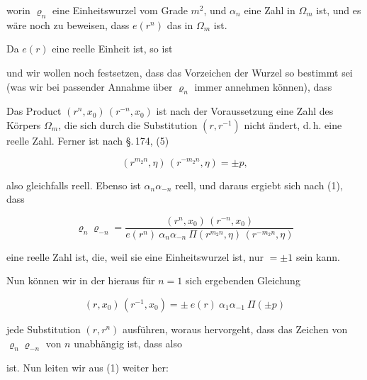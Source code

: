 worin $\varrho_n$ eine Einheitswurzel vom Grade $m^2$, und $\alpha_n$
eine Zahl in $\Omega_m$ ist, und es w\"are noch zu beweisen, dass
$e(r^n)$ das  in $\Omega_m$ ist.

Da $e(r)$ eine reelle Einheit ist, so ist


und wir wollen noch festsetzen, dass das Vorzeichen der Wurzel so
bestimmt sei (was wir bei passender Annahme \"uber $\varrho_n$ immer
annehmen k\"onnen), dass


Das Product $(r^n, x_0)\,(r^{-n}, x_0)$ ist nach der Voraussetzung
eine Zahl des K\"orpers $\Omega_m$, die sich durch die Substitution
$(r, r^{-1})$ nicht \"andert, d.\,h. eine reelle Zahl. Ferner ist
nach \S.\,174, (5)

\[
(r^{m_2 n}, \eta)\,(r^{-m_2 n}, \eta) = \pm p,
\]

also gleichfalls reell. Ebenso ist $\alpha_n \alpha_{-n}$ reell, und
daraus ergiebt sich nach (1), dass

\[
\varrho_n \varrho_{-n} = \frac{(r^n, x_0)\,(r^{-n}, x_0)}
{e(r^n)\ \alpha_n \alpha_{-n}\ \Pi(r^{m_2 n}, \eta)\,(r^{-m_2 n}, \eta)}
\]

eine reelle Zahl ist, die, weil sie eine Einheitswurzel ist, nur $=
\pm 1$ sein kann.

Nun k\"onnen wir in der hieraus f\"ur $n = 1$ sich ergebenden
Gleichung

\[
(r, x_0)\,(r^{-1}, x_0) = \pm\ e(r)\ \alpha_1 \alpha_{-1}\ \Pi(\pm p)
\]

jede Substitution $(r, r^n)$ ausf\"uhren, woraus hervorgeht, dass das
Zeichen von $\varrho_n \varrho_{-n}$ von $n$ unabh\"angig ist, dass
also


ist. Nun leiten wir aus (1) weiter her:


